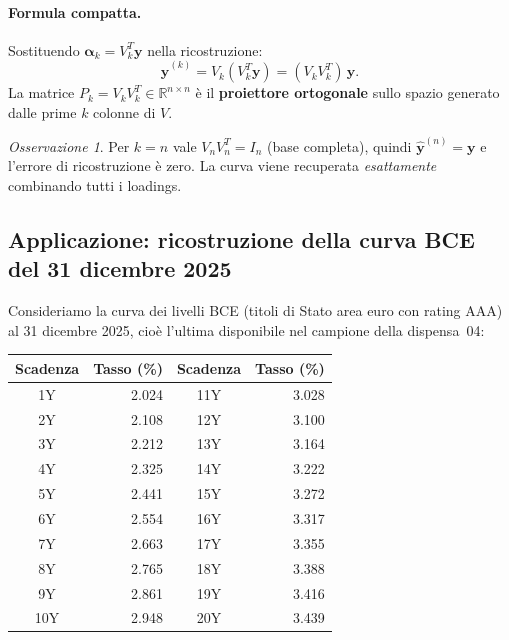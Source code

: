 \documentclass[11pt,a4paper]{article}
\theoremstyle{plain}
\theoremstyle{definition}
\theoremstyle{remark}
\newtheorem*{osservazione}{Osservazione}
\begin{document}
\paragraph{Formula compatta.}
Sostituendo $\boldsymbol{\alpha}_k = V_k^T \mathbf{y}$ nella ricostruzione:
\[
  \hat{\mathbf{y}}^{(k)} = V_k (V_k^T \mathbf{y}) = (V_k V_k^T)\,\mathbf{y}.
\]
La matrice $P_k = V_k V_k^T \in \mathbb{R}^{n \times n}$ è il \textbf{proiettore
ortogonale} sullo spazio generato dalle prime $k$ colonne di $V$.

\begin{osservazione}
Per $k = n$ vale $V_n V_n^T = I_n$ (base completa), quindi
$\hat{\mathbf{y}}^{(n)} = \mathbf{y}$ e l'errore di ricostruzione è zero.
La curva viene recuperata \emph{esattamente} combinando tutti i loadings.
\end{osservazione}

\subsection{Applicazione: ricostruzione della curva BCE del 31 dicembre 2025}

Consideriamo la curva dei livelli BCE (titoli di Stato area euro con rating AAA)
al 31 dicembre 2025, cio\`e l'ultima disponibile nel campione della
dispensa~04:

\begin{center}
\small
\renewcommand{\arraystretch}{1.15}
\begin{tabular}{cr @{\hspace{2em}} cr}
\toprule
Scadenza & \multicolumn{1}{c}{Tasso (\%)} & Scadenza & \multicolumn{1}{c}{Tasso (\%)} \\
\midrule
 1Y & 2.024 & 11Y & 3.028 \\
 2Y & 2.108 & 12Y & 3.100 \\
 3Y & 2.212 & 13Y & 3.164 \\
 4Y & 2.325 & 14Y & 3.222 \\
 5Y & 2.441 & 15Y & 3.272 \\
 6Y & 2.554 & 16Y & 3.317 \\
 7Y & 2.663 & 17Y & 3.355 \\
 8Y & 2.765 & 18Y & 3.388 \\
 9Y & 2.861 & 19Y & 3.416 \\
10Y & 2.948 & 20Y & 3.439 \\
\bottomrule
\end{tabular}
\end{center}
\end{document}
